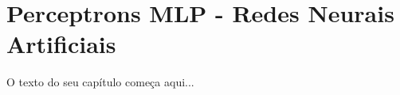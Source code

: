 
\chapter{Perceptrons MLP - Redes Neurais Artificiais}
\label{cap:mlp}

O texto do seu capítulo começa aqui...